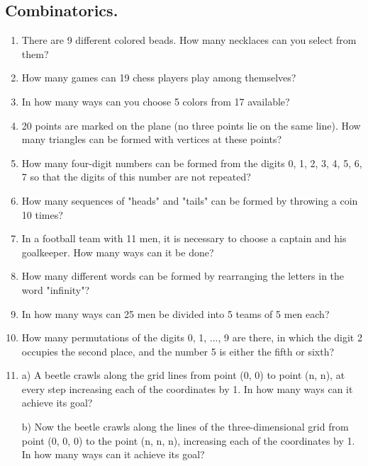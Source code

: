 \documentclass[a4paper,12pt]{article}
\begin{document}

\begin{large}

\section*{Combinatorics.}

\begin{enumerate}
\item There are 9 different colored beads. How many necklaces can you select from them?

\item How many games can 19 chess players play among themselves?

\item In how many ways can you choose 5 colors from 17 available?

\item 20 points are marked on the plane (no three points lie on the same line).
How many triangles can be formed with vertices at these points?

\item How many four-digit numbers can be formed from the digits 0, 1, 2, 3, 4, 5, 6, 7
so that the digits of this number are not repeated?

\item How many sequences of "heads" and "tails" can be formed by throwing a coin 10 times?

\item In a football team with 11 men, it is necessary to choose a captain and his goalkeeper. How many ways can it be done?

\item How many different words can be formed by rearranging the letters in the word "infinity"?

\item In how many ways can 25 men be divided into 5 teams of 5 men each?

\item How many permutations of the digits 0, 1, ..., 9 are there, in which the digit 2 occupies the second place, and the number 5 is either the fifth or sixth?


\item a) A beetle crawls along the grid lines from point (0, 0) to point (n, n), at every step increasing each of the coordinates by 1. In how many ways can it achieve its goal?

b) Now the beetle crawls along the lines of the three-dimensional grid from point (0, 0, 0) to the point (n, n, n), increasing each of the coordinates by 1. In how many ways can it achieve its goal?


\end{enumerate}
\end{large}
\end{document}
